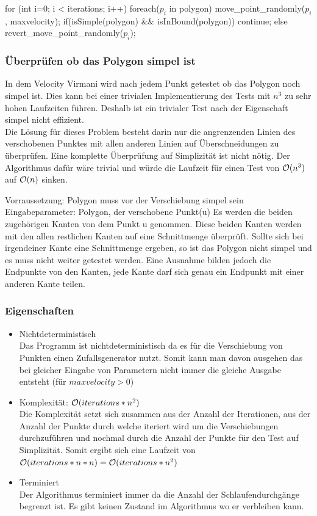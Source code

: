 \begin{code}[caption={Pseudocode},mathescape=true]
for (int i=0; i < iterations; i++)
{
	foreach($p_i$ in polygon)
	{
		move_point_randomly($p_i$, maxvelocity);
		if(isSimple(polygon) && isInBound(polygon))
			continue;
		else
			revert_move_point_randomly($p_i$);
	}
}
\end{code}

\subsubsection{Überprüfen ob das Polygon simpel ist}
In dem Velocity Virmani wird nach jedem Punkt getestet ob das Polygon noch simpel ist. Dies kann bei einer trivialen Implementierung des Tests mit $n^3$ zu sehr hohen Laufzeiten führen.
Deshalb ist ein trivialer Test nach der Eigenschaft simpel nicht effizient.\smallskip \\ 
Die Lösung für dieses Problem besteht darin nur die angrenzenden Linien des verschobenen Punktes mit allen anderen Linien auf Überschneidungen zu überprüfen. Eine komplette Überprüfung auf Simplizität ist nicht nötig.
Der Algorithmus dafür wäre trivial und würde die Laufzeit für einen Test von $\mathcal{O}(n^3)$ auf $\mathcal{O}(n)$ sinken.

Vorraussetzung: Polygon muss vor der Verschiebung simpel sein
Eingabeparameter: Polygon, der verschobene Punkt(u)
Es werden die beiden zugehörigen Kanten von dem Punkt u genommen. Diese beiden Kanten werden mit den allen restlichen Kanten auf eine Schnittmenge überprüft. Sollte sich bei irgendeiner Kante eine Schnittmenge ergeben, so ist das Polygon nicht simpel und es muss nicht weiter getestet werden. Eine Ausnahme bilden jedoch die Endpunkte von den Kanten, jede Kante darf sich genau ein Endpunkt mit einer anderen Kante teilen.


\subsubsection{Eigenschaften}
\begin{itemize}
	\item Nichtdeterministisch\\
	Das Programm ist nichtdeterministisch da es für die Verschiebung von Punkten einen Zufallsgenerator nutzt. Somit kann man davon ausgehen das bei gleicher Eingabe von Parametern nicht immer die gleiche Ausgabe entsteht (für $maxvelocity > 0$)
	\item Komplexität: $\mathcal{O}(iterations*n^2)$\\
	Die Komplexität setzt sich zusammen aus der Anzahl der Iterationen, aus der Anzahl der Punkte durch welche iteriert wird um die Verschiebungen durchzuführen und nochmal durch die Anzahl der Punkte für den Test auf Simplizität. Somit ergibt sich eine Laufzeit von $\mathcal{O}(iterations*n*n) = \mathcal{O}(iterations*n^2)$
	\item Terminiert\\
	Der Algorithmus terminiert immer da die Anzahl der Schlaufendurchgänge begrenzt ist. Es gibt keinen Zustand im Algorithmus wo er verbleiben kann.
\end{itemize}

